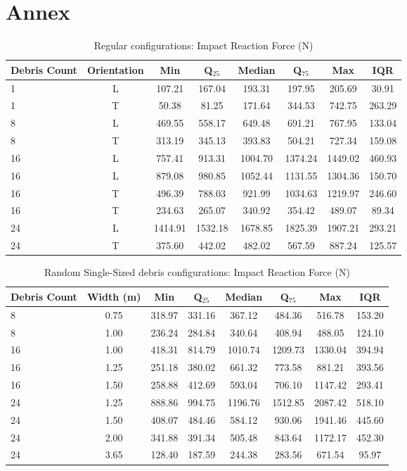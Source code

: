 \documentclass{article}
\begin{document}
{  

\section{Annex}
\begin{table}[h!]
\centering
\caption{Regular configurations: Impact Reaction Force (N)}
\begin{tabular}{lccccccc}
\toprule
\textbf{Debris Count} & \textbf{Orientation} & \textbf{Min} & \textbf{Q$_{25}$} & \textbf{Median} & \textbf{Q$_{75}$} & \textbf{Max} & \textbf{IQR} \\
\midrule
1 & L & 107.21 & 167.04 & 193.31 & 197.95 & 205.69 & 30.91 \\
1 & T & 50.38 & 81.25 & 171.64 & 344.53 & 742.75 & 263.29 \\
8 & L & 469.55 & 558.17 & 649.48 & 691.21 & 767.95 & 133.04 \\
8 & T & 313.19 & 345.13 & 393.83 & 504.21 & 727.34 & 159.08 \\
16 & L & 757.41 & 913.31 & 1004.70 & 1374.24 & 1449.02 & 460.93 \\
16 & L & 879.08 & 980.85 & 1052.44 & 1131.55 & 1304.36 & 150.70 \\
16 & T & 496.39 & 788.03 & 921.99 & 1034.63 & 1219.97 & 246.60 \\
16 & T & 234.63 & 265.07 & 340.92 & 354.42 & 489.07 & 89.34 \\
24 & L & 1414.91 & 1532.18 & 1678.85 & 1825.39 & 1907.21 & 293.21 \\
24 & T & 375.60 & 442.02 & 482.02 & 567.59 & 887.24 & 125.57 \\
\bottomrule
\end{tabular}
\end{table}

\begin{table}[h!]
\centering
\caption{Random Single-Sized debris configurations: Impact Reaction Force (N)}
\begin{tabular}{lccccccc}
\toprule
\textbf{Debris Count} & \textbf{Width (m)} & \textbf{Min} & \textbf{Q$_{25}$} & \textbf{Median} & \textbf{Q$_{75}$} & \textbf{Max} & \textbf{IQR} \\
\midrule
8 & 0.75 & 318.97 & 331.16 & 367.12 & 484.36 & 516.78 & 153.20 \\
8 & 1.00 & 236.24 & 284.84 & 340.64 & 408.94 & 488.05 & 124.10 \\
16 & 1.00 & 418.31 & 814.79 & 1010.74 & 1209.73 & 1330.04 & 394.94 \\
16 & 1.25 & 251.18 & 380.02 & 661.32 & 773.58 & 881.21 & 393.56 \\
16 & 1.50 & 258.88 & 412.69 & 593.04 & 706.10 & 1147.42 & 293.41 \\
24 & 1.25 & 888.86 & 994.75 & 1196.76 & 1512.85 & 2087.42 & 518.10 \\
24 & 1.50 & 408.07 & 484.46 & 584.12 & 930.06 & 1941.46 & 445.60 \\
24 & 2.00 & 341.88 & 391.34 & 505.48 & 843.64 & 1172.17 & 452.30 \\
24 & 3.65 & 128.40 & 187.59 & 244.38 & 283.56 & 671.54 & 95.97 \\
\bottomrule
\end{tabular}
\end{table}

}
\end{document}

